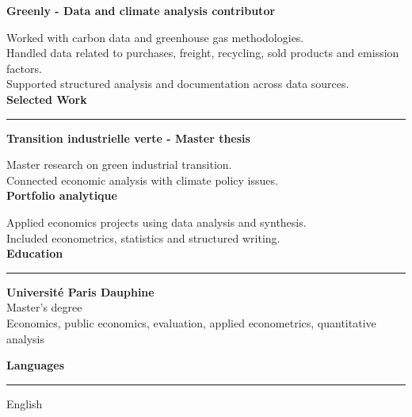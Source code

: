 \documentclass[11pt,a4paper]{article}
\newcommand{\sectiontitle}[1]{\vspace{0.26cm}\textbf{\large #1}\vspace{0.10cm}\hrule\vspace{0.13cm}}
\begin{document}
\vspace{0.25cm}
\textbf{Greenly - Data and climate analysis contributor} \hfill  \hfill 

Worked with carbon data and greenhouse gas methodologies.\\
Handled data related to purchases, freight, recycling, sold products and emission factors.\\
Supported structured analysis and documentation across data sources.\\


\sectiontitle{Selected Work}

\textbf{Transition industrielle verte - Master thesis} \hfill 

Master research on green industrial transition.\\
Connected economic analysis with climate policy issues.\\


\vspace{0.22cm}
\textbf{Portfolio analytique} \hfill 

Applied economics projects using data analysis and synthesis.\\
Included econometrics, statistics and structured writing.\\



\sectiontitle{Education}

\textbf{Université Paris Dauphine} \hfill \\
Master's degree\\
Economics, public economics, evaluation, applied econometrics, quantitative analysis


\sectiontitle{Languages}

English
\end{document}
